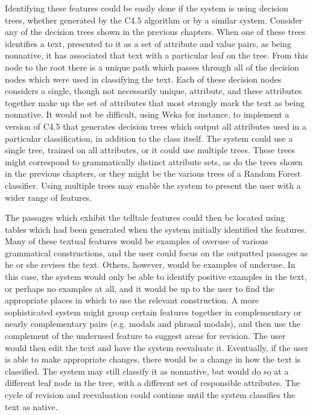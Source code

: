 \documentclass[main.tex]{subfiles}
\begin{document}
Identifying these features could be easily done if the system is using decision trees, whether generated by the C4.5 algorithm or by a similar system. Consider any of the decision trees shown in the previous chapters. When one of these trees identifies a text, presented to it as a set of attribute and value pairs, as being nonnative, it has associated that text with a particular leaf on the tree. From this node to the root there is a unique path which passes through all of the decision nodes which were used in classifying the text. Each of these decision nodes considers a single, though not necessarily unique, attribute, and these attributes together make up the set of attributes that most strongly mark the text as being nonnative. It would not be difficult, using Weka for instance, to implement a version of C4.5 that generates decision trees which output all attributes used in a particular classification, in addition to the class itself. The system could use a single tree, trained on all attributes, or it could use multiple trees. These trees might correspond to grammatically distinct attribute sets, as do the trees shown in the previous chapters, or they might be the various trees of a Random Forest classifier. Using multiple trees may enable the system to present the user with a wider range of features.

The passages which exhibit the telltale features could then be located using tables which had been generated when the system initially identified the features. Many of these textual features would be examples of overuse of various grammatical constructions, and the user could focus on the outputted passages as he or she revises the text. Others, however, would be examples of underuse. In this case, the system would only be able to identify positive examples in the text, or perhaps no examples at all, and it would be up to the user to find the appropriate places in which to use the relevant construction. A more sophisticated system might group certain features together in complementary or nearly complementary pairs (e.g. modals and phrasal modals), and then use the complement of the underused feature to suggest areas for revision. The user would then edit the text and have the system reevaluate it. Eventually, if the user is able to make appropriate changes, there would be a change in how the text is classified. The system may still classify it as nonnative, but would do so at a different leaf node in the tree, with a different set of responsible attributes. The cycle of revision and reevaluation could continue until the system classifies the text as native.




\biblio
\end{document}
